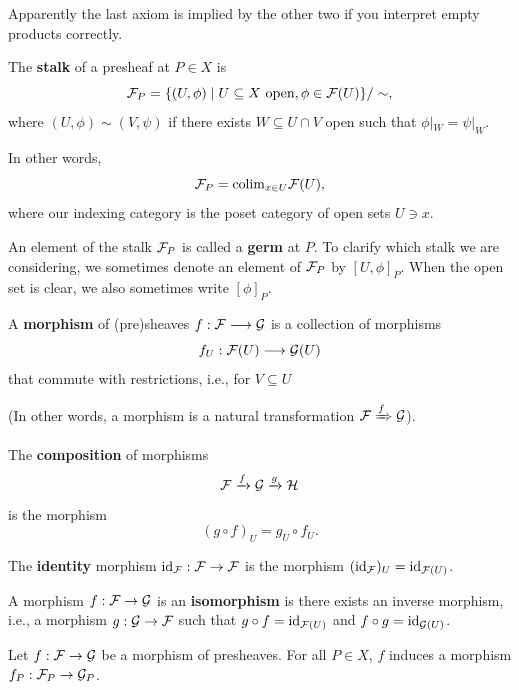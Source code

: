 \documentclass[12pt]{article}
\begin{document}
\begin{rmk}
    Apparently the last axiom is implied by the other two if you interpret empty products correctly.
\end{rmk}

\begin{defn}
    The \textbf{stalk} of a presheaf at $P\in X$ is
    \[\cF_P = \{(U,\phi) \mid U\subseteq X\text{ open}, \phi\in \cF(U)\}/\sim,\]
    where $(U,\phi)\sim (V,\psi)$ if there exists $W\subseteq U\cap V$ open such that $\phi|_W = \psi|_W$.
    
    In other words,
    \[\mathcal{F}_P = \mathrm{colim}_{x\in U} \mathcal{F}(U),\]
    where our indexing category is the poset category of open sets $U\ni x$.
    
    An element of the stalk $\mathcal{F}_P$ is called a \textbf{germ} at $P$. To clarify which stalk we are considering, we sometimes denote an element of $\mathcal{F}_P$ by $[U,\phi]_P$. When the open set is clear, we also sometimes write $[\phi]_P$.
\end{defn}

\begin{defn}
    A \textbf{morphism} of (pre)sheaves $f: \mathcal{F}\longrightarrow \mathcal{G}$ is a collection of morphisms
    \[f_U: \mathcal{F}(U) \longrightarrow \mathcal{G}(U)\]
    that commute with restrictions, i.e., for $V\subseteq U$
    \begin{center}
    \end{center}
    (In other words, a morphism is a natural transformation $\mathcal{F}\xRightarrow{f}\mathcal{G}$).
    
    The \textbf{composition} of morphisms
    \[\mathcal{F} \xrightarrow{f} \mathcal{G} \xrightarrow{g} \mathcal{H}\]
    is the morphism
    \[(g\circ f)_U = g_U \circ f_U.\]
    
    The \textbf{identity} morphism $\mathrm{id}_{\mathcal{F}}: \mathcal{F}\to \mathcal{F}$ is the morphism $(\mathrm{id}_{\mathcal{F}})_U = \mathrm{id}_{\mathcal{F}(U)}$.
    
    A morphism $f: \mathcal{F} \to \mathcal{G}$ is an \textbf{isomorphism} is there exists an inverse morphism, i.e., a morphism $g: \mathcal{G} \to \mathcal{F}$ such that $g\circ f = \mathrm{id}_{\mathcal{F}(U)}$ and $f\circ g = \mathrm{id}_{\mathcal{G}(U)}$.
\end{defn}

\begin{prop}
    Let $f: \mathcal{F} \to \mathcal{G}$ be a morphism of presheaves. For all $P\in X$, $f$ induces a morphism $f_P: \mathcal{F}_P \to \mathcal{G}_P$.
\end{prop}
\end{document}
